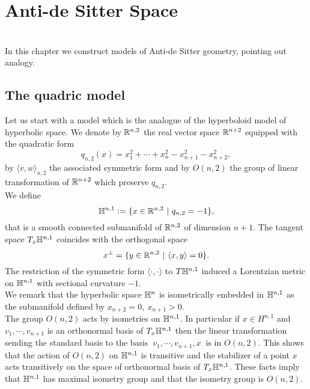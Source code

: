 \chapter{Anti-de Sitter Space} \label{chapter:2}

\\
In this chapter we construct models of Anti-de Sitter geometry, pointing out analogy.

\section{The quadric model}
Let us start with a model which is the analogue of the hyperboloid model of hyperbolic space. We denote by $\mathbb{R} ^{n,2}$ the real vector space $\mathbb{R} ^{n+2}$ equipped with the quadratic form
\[
q_{n,2}(x) = x_1^2 + \cdots + x_n^2 - x_{n+1}^2 - x_{n+2}^2,
\]
by $\langle v,w \rangle_{n,2}$ the associated symmetric form and by $O(n,2)$ the group of linear transformation of $\mathbb{R}^{n+2}$ which preserve $q_{n,2}$.\\
We define
\[
\mathbb{H}^{n,1} := \{ x\in \mathbb{R}^{n,2} \ | \ q_{n,2} = -1 \},
\]
that is a smooth connected submanifold of $\mathbb{R}^{n,2}$ of dimension $n+1$. The tangent space $T_x \mathbb{H}^{n,1}$ coincides with the orthogonal space
\[
x^\perp = \{ y\in\mathbb{R}^{n,2} \ | \ \langle x,y \rangle=0 \}.
\]
The restriction of the symmetric form $\langle \cdot , \cdot \rangle$ to $T\mathbb{H}^{n,1}$ induced a Lorentzian metric on $\mathbb{H}^{n,1}$ with sectional curvature $-1$.\\
We remark that the hyperbolic space $\mathbb{H}^n$ is isometrically embedded in $\mathbb{H}^{n,1}$ as the submanifold defined by $x_{n+2}=0,\ x_{n+1}>0$.\\
The group $O(n,2)$ acts by isometries on $\mathbb{H}^{n,1}$. In particular if $x\in H^{n,1}$ and $v_1, \cdots , v_{n+1}$ is an orthonormal basis of $T_x \mathbb{H}^{n,1}$ then the linear transformation sending the standard basis to the basis $\ v_1,\cdots,v_{n+1},x \ $ is in $O(n,2)$. This shows that the action of $O(n,2)$ on $\mathbb{H}^{n,1}$ is transitive and the stabilizer of a point $x$ acts transitively on the space of orthonormal basis of $T_x\mathbb{H}^{n,1}$. 
These facts imply that $\mathbb{H}^{n,1}$ has maximal isometry group and that the isometry group is $O(n,2)$.\\

